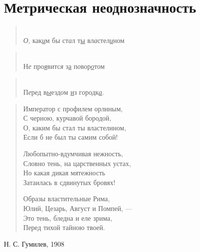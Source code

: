 \documentclass{beamer}
\begin{document}
\section{Метрическая неоднозначность}\label{sec:ambig}

\begin{frame}


\begin{verse}
 \\
\textit{О}, как\underline{\textit{и}}м бы ст\textit{а}л т\underline{ы} вл\textit{а}стел\underline{\textit{и}}ном	
\end{verse}


\begin{verse}
 \\
Н\textit{е} про\textit{\underline{я}}витс\textit{я} з\underline{а} п\textit{о}вор\textit{\underline{о}}том
\end{verse}


\begin{verse}
 \\
П\textit{е}ред в\underline{\textit{ы}}езд\textit{о}м \underline{и}з г\textit{о}родк\underline{\textit{а}}.
\end{verse}

\end{frame}

\begin{frame}
\begin{verse}
Император с профилем орлиным,\\
С черною, курчавой бородой,\\
О, каким бы стал ты властелином,\\
Если б не был ты самим собой!

Любопытно-вдумчивая нежность,\\
Словно тень, на царственных устах,\\
Но какая дикая мятежность\\
Затаилась в сдвинутых бровях!

Образы властительные Рима,\\
Юлий, Цезарь, Август и Помпей, —\\
Это тень, бледна и еле зрима,\\
Перед тихой тайною твоей.

\end{verse}
Н. С. Гумилев, 1908
\end{frame}
\end{document}

